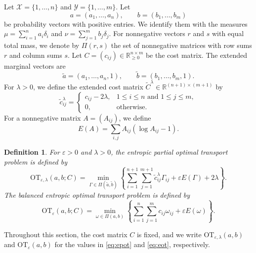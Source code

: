 \documentclass[a4paper,11pt]{article}
\numberwithin{equation}{section}
\newtheorem{dfn}[thm]{Definition}
\newcommand{\eps}{\varepsilon}
\newcommand{\RR}{\mathbb{R}}
\newcommand{\OT}{\mathrm{OT}}
\newcommand{\X}{\mathcal{X}}
\newcommand{\Y}{\mathcal{Y}}
\begin{document}
Let $\X = \{1,\ldots,n\}$ and $\Y = \{1,\ldots,m\}$. Let
\begin{equation*}
  a = (a_1,\ldots,a_n),\qquad b = (b_1,\ldots,b_m)
\end{equation*}
be probability vectors with positive entries. We identify them with the measures $\mu = \sum_{i=1}^n a_i\delta_i$ and $\nu = \sum_{j=1}^m b_j\delta_j$. For nonnegative vectors $r$ and $s$ with equal total mass, we denote by $\Pi(r,s)$ the set of nonnegative matrices with row sums $r$ and column sums $s$. Let $C = (c_{ij})\in \RR^{n\times m}_{\geq 0}$ be the cost matrix. The extended marginal vectors are
\begin{equation*}
  \widetilde a = (a_1,\ldots,a_n,1),\qquad \widetilde b = (b_1,\ldots,b_m,1).
\end{equation*}
For $\lambda>0$, we define the extended cost matrix $\widetilde C^{\lambda}\in\RR^{(n+1)\times(m+1)}$ by
\begin{equation*}
  \widetilde c^{\lambda}_{ij} = \begin{cases} c_{ij} - 2\lambda, & 1 \leq i \leq n \text{ and } 1 \leq j \leq m,\\ 0, & \text{otherwise.} \end{cases}
\end{equation*}
For a nonnegative matrix $A=(A_{ij})$, we define
\begin{equation*}
  E(A) = \sum_{i,j}A_{ij}(\log A_{ij} - 1).
\end{equation*}

\begin{dfn}\label{dfn:epot}
For $\eps > 0$ and $\lambda > 0$, the entropic partial optimal transport problem is defined by
\begin{equation}\label{eq:epot}
  \OT_{\eps,\lambda}(a,b;C) = \min_{\Gamma \in \Pi(\widetilde a,\widetilde b)} \left\{\sum_{i = 1}^{n + 1}\sum_{j = 1}^{m + 1}\widetilde c^{\lambda}_{ij}\Gamma_{ij} + \eps E(\Gamma) + 2\lambda\right\}.
\end{equation}
The balanced entropic optimal transport problem is defined by
\begin{equation}\label{eq:eot}
  \OT_{\eps}(a,b;C) = \min_{\omega \in \Pi(a,b)} \left\{\sum_{i = 1}^{n}\sum_{j = 1}^{m}c_{ij}\omega_{ij} + \eps E(\omega)\right\}.
\end{equation}
\end{dfn}
Throughout this section, the cost matrix $C$ is fixed, and we write $\OT_{\eps,\lambda}(a,b)$ and $\OT_{\eps}(a,b)$ for the values in \eqref{eq:epot} and \eqref{eq:eot}, respectively.
\end{document}
